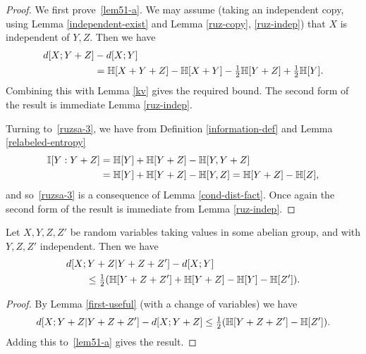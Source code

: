  \begin{proof}
    \leanok
  We first prove~\eqref{lem51-a}. We may assume (taking an independent copy, using Lemma \ref{independent-exist} and Lemma \ref{ruz-copy}, \ref{ruz-indep}) that $X$ is independent of $Y, Z$. Then we have
  \begin{align*}  d[X ;Y+ Z] & - d[X ;Y] \\ & = \mathbb{H}[X + Y + Z] - \mathbb{H}[X + Y] - \tfrac{1}{2}\mathbb{H}[Y + Z] + \tfrac{1}{2} \mathbb{H}[Y].\end{align*}
  Combining this with Lemma \ref{kv} gives the required bound. The second form of the result is immediate Lemma \ref{ruz-indep}.

  Turning to~\eqref{ruzsa-3}, we have from Definition \ref{information-def} and Lemma \ref{relabeled-entropy}
  \begin{align*}  \mathbb{I}[Y : Y+ Z] & = \mathbb{H}[Y] + \mathbb{H}[Y + Z] - \mathbb{H}[Y, Y + Z] \\ & = \mathbb{H}[Y] + \mathbb{H}[Y + Z] - \mathbb{H}[Y, Z]  = \mathbb{H}[Y + Z] - \mathbb{H}[Z],\end{align*}
  and so~\eqref{ruzsa-3} is a consequence of Lemma \ref{cond-dist-fact}. Once again the second form of the result is immediate from Lemma \ref{ruz-indep}.
\end{proof}

\begin{lemma}\label{second-useful}
  \leanok
  Let $X, Y, Z, Z'$ be random variables taking values in some abelian group, and with $Y, Z, Z'$ independent. Then we have
  \begin{align}\nonumber
  & d[X ;Y + Z | Y + Z + Z'] - d[X ;Y] \\ & \qquad \leq \tfrac{1}{2} ( \mathbb{H}[Y + Z + Z'] + \mathbb{H}[Y + Z] - \mathbb{H}[Y] - \mathbb{H}[Z']).\label{7111}
  \end{align}
  \end{lemma}

  \begin{proof}
    \leanok
  By Lemma \ref{first-useful} (with a change of variables) we have
  \[d[X ; Y + Z | Y + Z + Z'] - d[X ; Y + Z] \leq \tfrac{1}{2}( \mathbb{H}[Y + Z + Z'] - \mathbb{H}[Z']).\]
  Adding this to~\eqref{lem51-a} gives the result.
  \end{proof}
